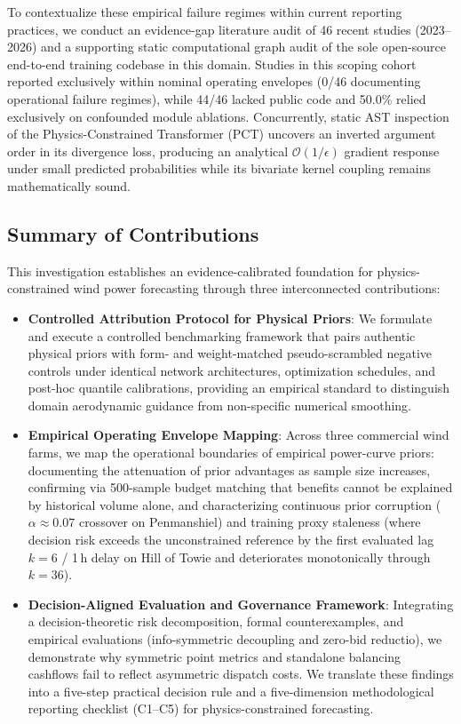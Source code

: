 To contextualize these empirical failure regimes within current reporting practices, we conduct an evidence-gap literature audit of 46 recent studies (2023--2026) and a supporting static computational graph audit of the sole open-source end-to-end training codebase in this domain. Studies in this scoping cohort reported exclusively within nominal operating envelopes (0/46 documenting operational failure regimes), while 44/46 lacked public code and 50.0\% relied exclusively on confounded module ablations. Concurrently, static AST inspection of the Physics-Constrained Transformer (PCT) uncovers an inverted argument order in its divergence loss, producing an analytical $\mathcal{O}(1/\epsilon)$ gradient response under small predicted probabilities while its bivariate kernel coupling remains mathematically sound.

\subsection{Summary of Contributions}
This investigation establishes an evidence-calibrated foundation for physics-constrained wind power forecasting through three interconnected contributions:
\begin{itemize}[leftmargin=*]
\item \textbf{Controlled Attribution Protocol for Physical Priors}: We formulate and execute a controlled benchmarking framework that pairs authentic physical priors with form- and weight-matched pseudo-scrambled negative controls under identical network architectures, optimization schedules, and post-hoc quantile calibrations, providing an empirical standard to distinguish domain aerodynamic guidance from non-specific numerical smoothing.
\item \textbf{Empirical Operating Envelope Mapping}: Across three commercial wind farms, we map the operational boundaries of empirical power-curve priors: documenting the attenuation of prior advantages as sample size increases, confirming via 500-sample budget matching that benefits cannot be explained by historical volume alone, and characterizing continuous prior corruption ($\alpha \approx 0.07$ crossover on Penmanshiel) and training proxy staleness (where decision risk exceeds the unconstrained reference by the first evaluated lag $k=6$ / 1\,h delay on Hill of Towie and deteriorates monotonically through $k=36$).
\item \textbf{Decision-Aligned Evaluation and Governance Framework}: Integrating a decision-theoretic risk decomposition, formal counterexamples, and empirical evaluations (info-symmetric decoupling and zero-bid reductio), we demonstrate why symmetric point metrics and standalone balancing cashflows fail to reflect asymmetric dispatch costs. We translate these findings into a five-step practical decision rule and a five-dimension methodological reporting checklist (C1--C5) for physics-constrained forecasting.
\end{itemize}

